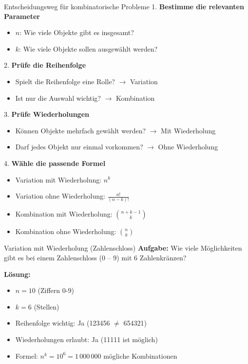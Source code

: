 \begin{KR}{Entscheidungsweg für kombinatorische Probleme}
1. \textbf{Bestimme die relevanten Parameter}
   \begin{itemize}
   \item $n$: Wie viele Objekte gibt es insgesamt?
   \item $k$: Wie viele Objekte sollen ausgewählt werden?
   \end{itemize}

2. \textbf{Prüfe die Reihenfolge}
   \begin{itemize}
   \item Spielt die Reihenfolge eine Rolle? $\rightarrow$ Variation
   \item Ist nur die Auswahl wichtig? $\rightarrow$ Kombination
   \end{itemize}

3. \textbf{Prüfe Wiederholungen}
   \begin{itemize}
   \item Können Objekte mehrfach gewählt werden? $\rightarrow$ Mit Wiederholung
   \item Darf jedes Objekt nur einmal vorkommen? $\rightarrow$ Ohne Wiederholung
   \end{itemize}

4. \textbf{Wähle die passende Formel}
   \begin{itemize}
   \item Variation mit Wiederholung: $n^k$
   \item Variation ohne Wiederholung: $\frac{n!}{(n-k)!}$
   \item Kombination mit Wiederholung: $\binom{n+k-1}{k}$
   \item Kombination ohne Wiederholung: $\binom{n}{k}$
   \end{itemize}
\end{KR}

\begin{example}{Variation mit Wiederholung (Zahlenschloss)}
\textbf{Aufgabe:} Wie viele Möglichkeiten gibt es bei einem Zahlenschloss (0 -- 9) mit 6 Zahlenkränzen?

\textbf{Lösung:}
\begin{itemize}
\item $n = 10$ (Ziffern 0-9)
\item $k = 6$ (Stellen)
\item Reihenfolge wichtig: Ja (123456 $\neq$ 654321)
\item Wiederholungen erlaubt: Ja (11111 ist möglich)
\item Formel: $n^k = 10^6 = 1\,000\,000$ mögliche Kombinationen
\end{itemize}
\end{example}

